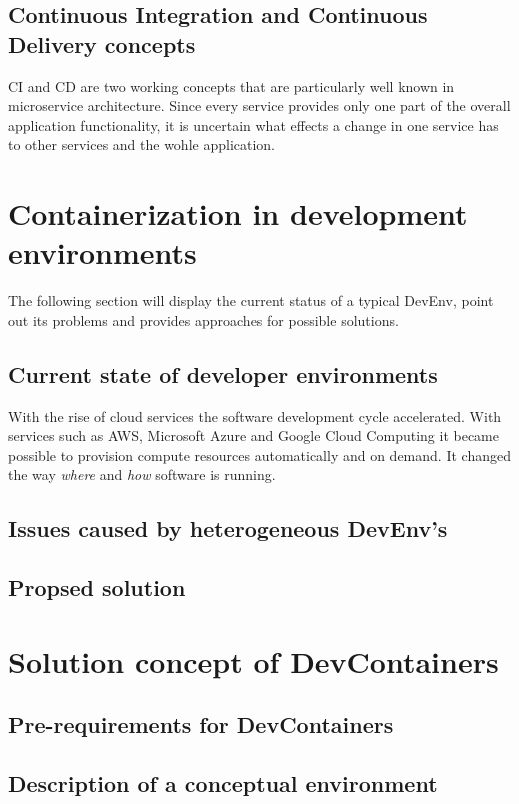 \documentclass[12pt, a4paper]{article}
\begin{document}
    \subsection{Continuous Integration and Continuous Delivery concepts}\label{ssec::ci_cd}
    \ac{CI} and \ac{CD} are two working concepts that are particularly well known in microservice architecture. Since every service provides only one part of the overall application functionality, it is uncertain what effects a change in one service has to other services and the wohle application.

\section{Containerization in development environments}\label{sec::problem}
The following section will display the current status of a typical \ac{DevEnv}, point out its problems and provides approaches for possible solutions.
    \subsection{Current state of developer environments}
    With the rise of cloud services the software development cycle accelerated. With services such as \ac{AWS}, Microsoft Azure and Google Cloud Computing it became possible to provision compute resources automatically and on demand. It changed the way \textit{where} and \textit{how} software is running.\newline
    \subsection{Issues caused by heterogeneous \acs{DevEnv}'s}
    \subsection{Propsed solution}

\section{Solution concept of DevContainers}\label{sec::solution_concept}
    \subsection{Pre-requirements for DevContainers}
    \subsection{Description of a conceptual environment}
\end{document}
